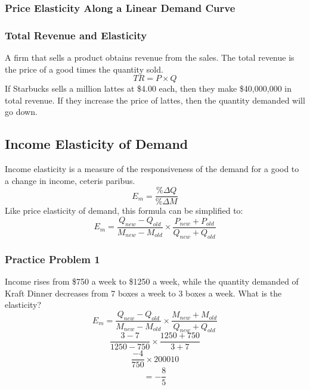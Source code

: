 \documentclass[letterpaper, 12pt]{article}
\begin{document}
\subsubsection{Price Elasticity Along a Linear Demand Curve}
\begin{center}
\end{center}

\subsubsection{Total Revenue and Elasticity}
A firm that sells a product obtains revenue from the sales. The total revenue
is the price of a good times the quantity sold.
\[ TR = P \times Q \]
If Starbucks sells a million lattes at \$4.00 each, then they make \$40,000,000
in total revenue. If they increase the price of lattes, then the quantity
demanded will go down.

\subsection{Income Elasticity of Demand}
Income elasticity is a measure of the responsiveness of the demand for a good to a change in income, ceteris paribus.
\[ E_{m} = \frac{\%\Delta Q}{\%\Delta M} \]
Like price elasticity of demand, this formula can be simplified to:
\[ E_{m} = \frac{Q_{new}-Q_{old}}{M_{new}-M_{old}}\times
           \frac{P_{new}+P_{old}}{Q_{new}+Q_{old}} \]

\subsubsection{Practice Problem 1}
Income rises from \$750 a week to \$1250 a week, while the quantity demanded
of Kraft Dinner decreases from 7 boxes a week to 3 boxes a week. What is the
elasticity?
\[ E_{m} = \frac{Q_{new}-Q_{old}}{M_{new}-M_{old}}\times
           \frac{M_{new}+M_{old}}{Q_{new}+Q_{old}} \]
\[ \frac{3-7}{1250-750}\times\frac{1250+750}{3+7} \]
\[ \frac{-4}{750}\times{2000}{10} \]
\[ = -\frac{8}{5} \]
\end{document}

